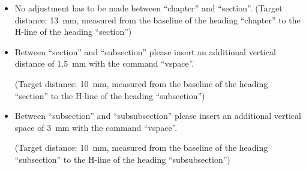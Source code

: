 \begin{itemize}
\item \justifying No adjustment has to be made between ``chapter'' and ``section''. (Target distance: 13~mm, measured from the baseline of the heading ``chapter'' to the H-line of the heading ``section'') 

\item \raggedright Between ``section'' and ``subsection'' please insert an additional vertical distance of 1.5~mm with the command ``vspace''.


(Target distance: 10~mm, measured from the baseline of the heading ``section'' to the H-line of the heading ``subsection'')

\item \raggedright Between ``subsection'' and ``subsubsection'' please insert an additional vertical space of 3~mm with the command ``vspace''.


(Target distance: 10~mm, measured from the baseline of the heading ``subsection'' to the H-line of the heading ``subsubsection'')
\end{itemize}

